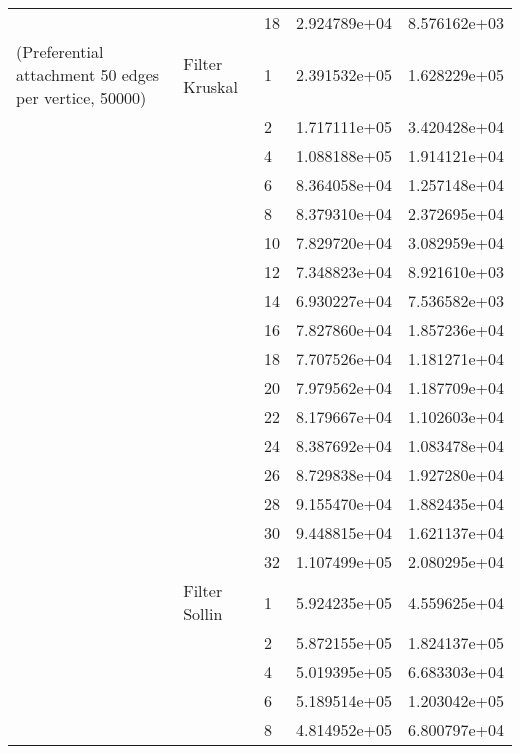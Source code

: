 \begin{tabular}{lllrr}
                      &            & 18 &  2.924789e+04 &  8.576162e+03 \\
(Preferential attachment 50 edges per vertice, 50000) & Filter Kruskal & 1  &  2.391532e+05 &  1.628229e+05 \\
                      &            & 2  &  1.717111e+05 &  3.420428e+04 \\
                      &            & 4  &  1.088188e+05 &  1.914121e+04 \\
                      &            & 6  &  8.364058e+04 &  1.257148e+04 \\
                      &            & 8  &  8.379310e+04 &  2.372695e+04 \\
                      &            & 10 &  7.829720e+04 &  3.082959e+04 \\
                      &            & 12 &  7.348823e+04 &  8.921610e+03 \\
                      &            & 14 &  6.930227e+04 &  7.536582e+03 \\
                      &            & 16 &  7.827860e+04 &  1.857236e+04 \\
                      &            & 18 &  7.707526e+04 &  1.181271e+04 \\
                      &            & 20 &  7.979562e+04 &  1.187709e+04 \\
                      &            & 22 &  8.179667e+04 &  1.102603e+04 \\
                      &            & 24 &  8.387692e+04 &  1.083478e+04 \\
                      &            & 26 &  8.729838e+04 &  1.927280e+04 \\
                      &            & 28 &  9.155470e+04 &  1.882435e+04 \\
                      &            & 30 &  9.448815e+04 &  1.621137e+04 \\
                      &            & 32 &  1.107499e+05 &  2.080295e+04 \\
                      & Filter Sollin & 1  &  5.924235e+05 &  4.559625e+04 \\
                      &            & 2  &  5.872155e+05 &  1.824137e+05 \\
                      &            & 4  &  5.019395e+05 &  6.683303e+04 \\
                      &            & 6  &  5.189514e+05 &  1.203042e+05 \\
                      &            & 8  &  4.814952e+05 &  6.800797e+04 \\

\end{tabular}
